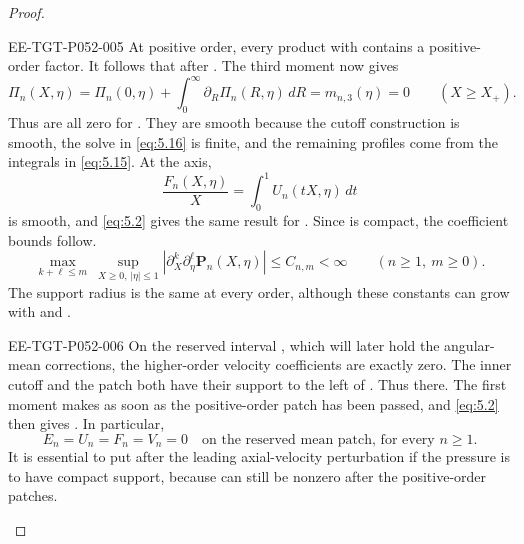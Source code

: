 \begin{proof}
\begin{EESegment}{EE-TGT-P052-005}
At positive order, every product  with  contains a
positive-order factor. It follows that  after
. The third moment now gives
\[
\Pi_n(X,\eta)
=\Pi_n(0,\eta)+\int_0^\infty\partial_R\Pi_n(R,\eta)\,dR
=m_{n,3}(\eta)=0
\qquad (X\geq X_+).
\]
Thus  are all zero for
. They are smooth because the cutoff construction is smooth, the solve in
\eqref{eq:5.16} is finite, and the remaining profiles come from the integrals in \eqref{eq:5.15}. At the axis,
\[
\frac{F_n(X,\eta)}{X}=\int_0^1U_n(tX,\eta)\,dt
\]
is smooth, and \eqref{eq:5.2} gives the same result for . Since
 is compact, the coefficient bounds follow.
\begin{equation}\label{eq:5.17}
\max_{k+\ell\leq m}\ \sup_{X\geq0,\,|\eta|\leq1}
|\partial_X^k\partial_\eta^\ell\mathbf P_n(X,\eta)|
\leq C_{n,m}<\infty
\qquad(n\geq1,\ m\geq0).
\tag{5.17}
\end{equation}
The support radius is the same at every order, although these constants can grow with
 and .
\end{EESegment}

\begin{EESegment}{EE-TGT-P052-006}
On the reserved interval , which will later hold the angular-mean
corrections, the higher-order velocity coefficients are exactly zero. The inner cutoff and the patch
 both have their support to the left of
. Thus  there. The first moment makes
 as soon as the positive-order patch has been passed, and \eqref{eq:5.2} then gives
. In particular,
\begin{equation}\label{eq:5.18}
E_n=U_n=F_n=V_n=0
\quad\text{on the reserved mean patch, for every }n\geq1.
\tag{5.18}
\end{equation}
It is essential to put  after the leading axial-velocity perturbation if the pressure is to have
compact support, because  can still be nonzero after the positive-order patches.
\end{EESegment}


\end{proof}
